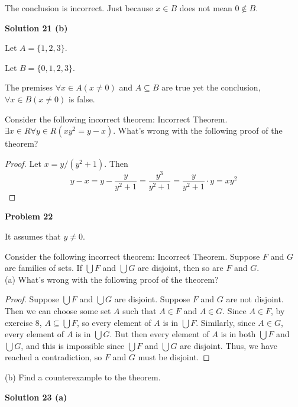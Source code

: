 The conclusion is incorrect. Just because $x \in B$ does not mean $0 \not \in
    B$.

\textbf{Solution 21 (b)}

Let $A = \{1, 2, 3\}$.

Let $B = \{0, 1, 2, 3\}$.

The premises $\forall{x} \in A(x \not = 0)$ and $A \subseteq B$ are true yet
the conclusion, $\forall{x} \in B(x \not = 0)$ is false.

\begin{tcolorbox}[title=Problem 22, breakable]
    Consider the following incorrect theorem:
    Incorrect Theorem. $\exists{x} \in  R\forall{y} \in  R(xy^2 = y - x)$.
    What’s wrong with the following proof of the
    theorem?
    \begin{proof}
        Let $x = y/(y^2 + 1)$. Then \\
        $$y - x = y - \frac{y}{y^2 + 1} = \frac{y^3}{y^2 + 1} = \frac{y}{y^2 + 1} \cdot y = xy^2$$
    \end{proof}
\end{tcolorbox}

\textbf{Problem 22}

It assumes that $y \not = 0$.

\begin{tcolorbox}[title=Problem 23, breakable]
    Consider the following incorrect theorem:
    Incorrect Theorem. Suppose $F$ and $G$ are families
    of sets. If $\bigcup F$ and $\bigcup G$ are disjoint, then so are $F$ and
    $G$. \\ 
    (a) What’s wrong with the following proof of the
    theorem?
    \begin{proof}
        Suppose $\bigcup F$ and $\bigcup G$ are disjoint. Suppose $F$
        and $G$ are not disjoint. Then we can choose some
        set $A$ such that $A \in  F$ and $A \in  G$. Since $A \in  F$, by
        exercise $8$, $A \subseteq  \bigcup F$, so every element of $A$ is in $\bigcup F$.
        Similarly, since $A \in  G$, every element of $A$ is in $\bigcup G$.
        But then every element of $A$ is in both $\bigcup F$ and $\bigcup G$,
        and this is impossible since $\bigcup F$ and $\bigcup G$ are disjoint.
        Thus, we have reached a contradiction, so $F$ and $G$
        must be disjoint.
    \end{proof}
    (b) Find a counterexample to the theorem.
\end{tcolorbox}

\textbf{Solution 23 (a)}

